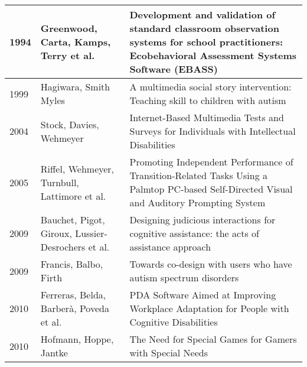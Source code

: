 \documentclass[utf8,english]{gradu3}
\begin{document}
\begin{longtable}{|>{\scriptsize}l|>{\scriptsize}p{3cm}|>{\scriptsize}p{10.4cm}|}
  1994          & Greenwood, Carta, Kamps, Terry et al.                        & Development and validation of standard classroom observation systems for school practitioners: Ecobehavioral Assessment Systems Software (EBASS)                                                                               \\ \hline
  1999          & Hagiwara, Smith Myles                                        & A multimedia social story intervention: Teaching skill to children with autism                                                                                                                                                 \\ \hline
  2004          & Stock, Davies, Wehmeyer                                      & Internet-Based Multimedia Tests and Surveys for Individuals with Intellectual Disabilities                                                                                                                                     \\ \hline
  2005          & Riffel, Wehmeyer, Turnbull, Lattimore et al.                 & Promoting Independent Performance of Transition-Related Tasks Using a Palmtop PC-based Self-Directed Visual and Auditory Prompting System                                                                                      \\ \hline
  2009          & Bauchet, Pigot, Giroux, Lussier-Desrochers et al.            & Designing judicious interactions for cognitive assistance: the acts of assistance approach                                                                                                                                     \\ \hline
  2009          & Francis, Balbo, Firth                                        & Towards co-design with users who have autism spectrum disorders                                                                                                                                                                \\ \hline
  2010          & Ferreras, Belda, Barberà, Poveda et al.                      & PDA Software Aimed at Improving Workplace Adaptation for People with Cognitive Disabilities                                                                                                                                    \\ \hline
  2010          & Hofmann, Hoppe, Jantke                                       & The Need for Special Games for Gamers with Special Needs                                                                                                                                                                       \\ \hline

\end{longtable}
\end{document}
